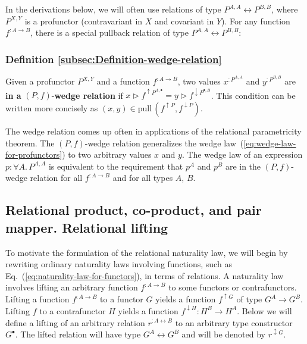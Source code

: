 In the derivations below, we will often use relations of type $P^{A,A}\leftrightarrow P^{B,B}$,
where $P^{X,Y}$ is a profunctor (contravariant in $X$ and covariant
in $Y$). For any function $f^{:A\rightarrow B}$, there is a special
pullback relation of type $P^{A,A}\leftrightarrow P^{B,B}$: 

\subsubsection{Definition \label{subsec:Definition-wedge-relation}\ref{subsec:Definition-wedge-relation}}

Given a profunctor
$P^{X,Y}$ and a function $f^{:A\rightarrow B}$, two values $x^{:P^{A,A}}$
and $y^{:P^{B,B}}$ are \textbf{in a} $\left(P,f\right)$-\textbf{wedge
relation} if $x\triangleright f^{\uparrow P^{A,\bullet}}=y\triangleright f^{\downarrow P^{\bullet,B}}$.
This condition can be written more concisely as $(x,y)\in\text{pull}\,(f^{\uparrow P},f^{\downarrow P})$.

The wedge relation comes up often in applications of the relational
parametricity theorem. The $\left(P,f\right)$-wedge relation generalizes
the wedge law~(\ref{eq:wedge-law-for-profunctors}) to two arbitrary
values $x$ and $y$. The wedge law of an expression $p:\forall A.\,P^{A,A}$
is equivalent to the requirement that $p^{A}$ and $p^{B}$ are in
the $\left(P,f\right)$-wedge relation for all $f^{:A\rightarrow B}$
and for all types $A$, $B$. 

\subsection{Relational product, co-product, and pair mapper. Relational lifting}

To motivate the formulation of the relational naturality law, we will
begin by rewriting ordinary naturality laws involving functions, such
as Eq.~(\ref{eq:naturality-law-for-functors}), in terms of relations.
A naturality law involves lifting an arbitrary function $f^{:A\rightarrow B}$
to some functors or contrafunctors. Lifting a function $f^{:A\rightarrow B}$
to a functor $G$ yields a function $f^{\uparrow G}$ of type $G^{A}\rightarrow G^{B}$.
Lifting $f$ to a contrafunctor $H$ yields a function $f^{\downarrow H}:H^{B}\rightarrow H^{A}$.
Below we will define a lifting of an arbitrary relation $r^{:A\leftrightarrow B}$
to an arbitrary type constructor $G^{\bullet}$. The lifted relation
will have type $G^{A}\leftrightarrow G^{B}$ and will be denoted by
$r^{\updownarrow G}$.


